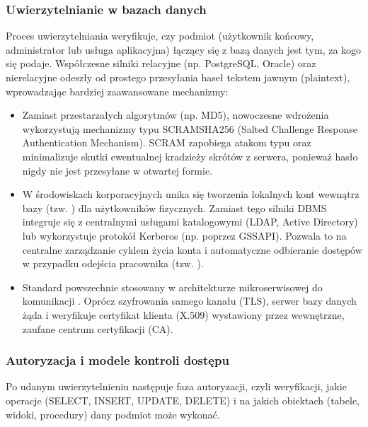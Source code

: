\documentclass[letterpaper,10pt,polish]{sphinxmanual}
\begin{document}
\subsubsection{Uwierzytelnianie w bazach danych}
\label{\detokenize{rozdzia_u0142_2/rozdzia_u0142_27/rozdzial_3:uwierzytelnianie-w-bazach-danych}}
\sphinxAtStartPar
Proces uwierzytelniania weryfikuje, czy podmiot (użytkownik końcowy, administrator lub usługa aplikacyjna) łączący się z bazą danych jest tym, za kogo się podaje. Współczesne silniki relacyjne (np. PostgreSQL, Oracle) oraz nierelacyjne odeszły od prostego przesyłania haseł tekstem jawnym (plaintext), wprowadzając bardziej zaawansowane mechanizmy:
\begin{itemize}
\item {} 
\sphinxAtStartPar
{} Zamiast przestarzałych algorytmów (np. MD5), nowoczesne wdrożenia wykorzystują mechanizmy typu SCRAM\sphinxhyphen{}SHA\sphinxhyphen{}256 (Salted Challenge Response Authentication Mechanism). SCRAM zapobiega atakom typu  oraz minimalizuje skutki ewentualnej kradzieży skrótów z serwera, ponieważ hasło nigdy nie jest przesyłane w otwartej formie.

\item {} 
\sphinxAtStartPar
{} W środowiskach korporacyjnych unika się tworzenia lokalnych kont wewnątrz bazy (tzw. ) dla użytkowników fizycznych. Zamiast tego silniki DBMS integruje się z centralnymi usługami katalogowymi (LDAP, Active Directory) lub wykorzystuje protokół Kerberos (np. poprzez GSSAPI). Pozwala to na centralne zarządzanie cyklem życia konta i automatyczne odbieranie dostępów w przypadku odejścia pracownika (tzw. ).

\item {} 
\sphinxAtStartPar
{} Standard powszechnie stosowany w architekturze mikroserwisowej do komunikacji . Oprócz szyfrowania samego kanału (TLS), serwer bazy danych żąda i weryfikuje certyfikat klienta (X.509) wystawiony przez wewnętrzne, zaufane centrum certyfikacji (CA).

\end{itemize}


\subsubsection{Autoryzacja i modele kontroli dostępu}
\label{\detokenize{rozdzia_u0142_2/rozdzia_u0142_27/rozdzial_3:autoryzacja-i-modele-kontroli-dostepu}}
\sphinxAtStartPar
Po udanym uwierzytelnieniu następuje faza autoryzacji, czyli weryfikacji, jakie operacje (SELECT, INSERT, UPDATE, DELETE) i na jakich obiektach (tabele, widoki, procedury) dany podmiot może wykonać.
\end{document}
